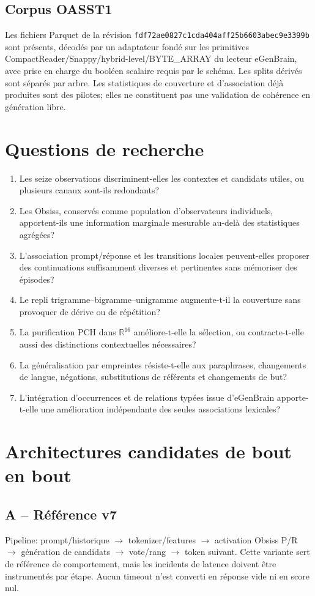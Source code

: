 \documentclass[11pt,a4paper]{report}
\begin{document}
\section{Corpus OASST1}
Les fichiers Parquet de la révision \texttt{fdf72ae0827c1cda404aff25b6603abec9e3399b} sont présents, décodés par un adaptateur fondé sur les primitives CompactReader/Snappy/hybrid-level/BYTE\_ARRAY du lecteur eGenBrain, avec prise en charge du booléen scalaire requis par le schéma. Les splits dérivés sont séparés par arbre. Les statistiques de couverture et d'association déjà produites sont des pilotes; elles ne constituent pas une validation de cohérence en génération libre.

\chapter{Questions de recherche}
\begin{enumerate}
\item Les seize observations discriminent-elles les contextes et candidats utiles, ou plusieurs canaux sont-ils redondants?
\item Les Obsiss, conservés comme population d'observateurs individuels, apportent-ils une information marginale mesurable au-delà des statistiques agrégées?
\item L'association prompt/réponse et les transitions locales peuvent-elles proposer des continuations suffisamment diverses et pertinentes sans mémoriser des épisodes?
\item Le repli trigramme--bigramme--unigramme augmente-t-il la couverture sans provoquer de dérive ou de répétition?
\item La purification PCH dans $\mathbb R^{16}$ améliore-t-elle la sélection, ou contracte-t-elle aussi des distinctions contextuelles nécessaires?
\item La généralisation par empreintes résiste-t-elle aux paraphrases, changements de langue, négations, substitutions de référents et changements de but?
\item L'intégration d'occurrences et de relations typées issue d'eGenBrain apporte-t-elle une amélioration indépendante des seules associations lexicales?
\end{enumerate}

\chapter{Architectures candidates de bout en bout}
\section{A -- Référence v7}
Pipeline: prompt/historique $\to$ tokenizer/features $\to$ activation Obsiss P/R $\to$ génération de candidats $\to$ vote/rang $\to$ token suivant. Cette variante sert de référence de comportement, mais les incidents de latence doivent être instrumentés par étape. Aucun timeout n'est converti en réponse vide ni en score nul.
\end{document}
